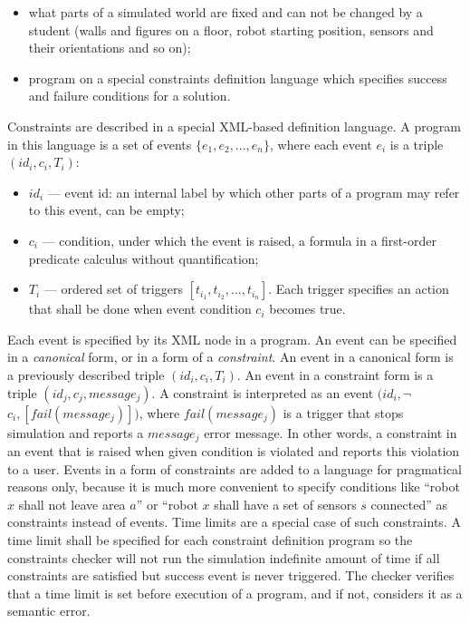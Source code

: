 \documentclass[conference]{IEEEtran}
\begin{document}
\begin{itemize}
    \item what parts of a simulated world are fixed and can not be changed by a student (walls and figures on a floor, robot starting position, sensors and their orientations and so on);
    \item program on a special constraints definition language which specifies success and failure conditions for a solution.
\end{itemize}

Constraints are described in a special XML-based definition language. A program in this language is a set of events $\{ e_1, e_2, ..., e_n \}$, where each event $e_i$ is a triple $(id_i, c_i, T_i)$:

\begin{itemize}
    \item $id_i$ --- event id: an internal label by which other parts of a program may refer to this event, can be empty;
    \item $c_i$ --- condition, under which the event is raised, a formula in a first-order predicate calculus without quantification;
    \item $T_i$ --- ordered set of triggers $[ t_{i_1}, t_{i_2}, ..., t_{i_n} ]$. Each trigger specifies an action that shall be done when event condition $c_i$ becomes true.
\end{itemize}

Each event is specified by its XML node in a program. An event can be specified in a \textit{canonical} form, or in a form of a \textit{constraint}. An event in a canonical form is a previously described triple $(id_i, c_i, T_i)$. An event in a constraint form is a triple $(id_j, c_j, message_j)$. A constraint is interpreted as an event $(id_i, $$\neg$$c_i, [ fail(message_j) ])$, where $fail(message_j)$ is a trigger that stops simulation and reports a $message_j$ error message. In other words, a constraint in an event that is raised when given condition is violated and reports this violation to a user. Events in a form of constraints are added to a language for pragmatical reasons only, because it is much more convenient to specify conditions like "`robot $x$ shall not leave area $a$"' or "`robot $x$ shall have a set of sensors $s$ connected"' as constraints instead of events. Time limits are a special case of such constraints. A time limit shall be specified for each constraint definition program so the constraints checker will not run the simulation indefinite amount of time if all constraints are satisfied but success event is never triggered. The checker verifies that a time limit is set before execution of a program, and if not, considers it as a semantic error.
\end{document}
